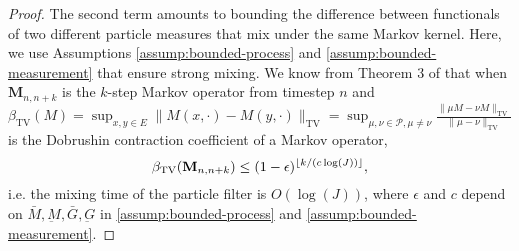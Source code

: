 \begin{proof}
The second term amounts to bounding the difference between functionals of two different particle measures that mix under the same Markov kernel. Here, we use Assumptions \ref{assump:bounded-process} and \ref{assump:bounded-measurement} that ensure strong mixing. We know from Theorem 3 of \cite{karjalainen23} that when $\textbf{M}_{n,n+k}$ is the $k$-step Markov operator from timestep $n$ and $\beta_{\text{TV}}(M) = \sup _{x, y \in E}\|M(x, \cdot)-M(y, \cdot)\|_{\mathrm{TV}}=\sup _{\mu, \nu \in \mathcal{P}, \mu \neq \nu} \frac{\|\mu M-\nu M\|_{\mathrm{TV}}}{\|\mu-\nu\|_{\mathrm{TV}}}$ is the Dobrushin contraction coefficient of a Markov operator, 
\begin{equation}\beta_{\text{TV}}(\textbf{M}_{n,n+k}) \leq (1-\epsilon)^{\lfloor k/(c\log(J)) \rfloor},\end{equation}
i.e. the mixing time of the particle filter is $O(\log(J))$, where $\epsilon$ and $c$ depend on $\bar{M}, \underbar{M}, \bar{G}, \underbar{G}$ in \ref{assump:bounded-process} and \ref{assump:bounded-measurement}. 


\end{proof}
